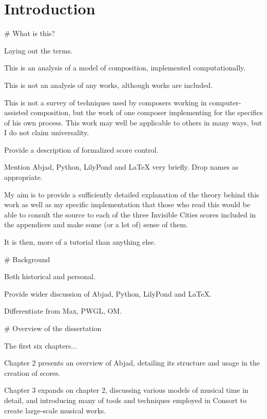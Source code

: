 \chapter{Introduction}
\label{chap:introduction}

\begin{markdown}

# What is this? 

Laying out the terms.

This is an analysis of a model of composition, implemented computationally.

This is not an analysis of any works, although works are included.

This is not a survey of techniques used by composers working in
computer-assisted composition, but the work of one composer implementing for
the specifics of his own process. This work may well be applicable to others in
many ways, but I do not claim universality.

Provide a description of formalized score control.

Mention Abjad, Python, LilyPond and LaTeX very briefly. Drop names as
appropriate.

My aim is to provide a sufficiently detailed explanation of the theory behind
this work as well as my specific implementation that those who read
this would be able to consult the source to each of the three Invisible Cities
scores included in the appendices and make some (or a lot of) sense of them.

It is then, more of a tutorial than anything else.

# Background

Both historical and personal.

Provide wider discussion of Abjad, Python, LilyPond and LaTeX.

Differentiate from Max, PWGL, OM.

# Overview of the dissertation

The first six chapters...

Chapter 2 presents an overview of Abjad, detailing its structure and usage in
the creation of scores.

Chapter 3 expands on chapter 2, discussing various models of musical time in
detail, and introducing many of tools and techniques employed in Consort to
create large-scale musical works.


\end{markdown}
